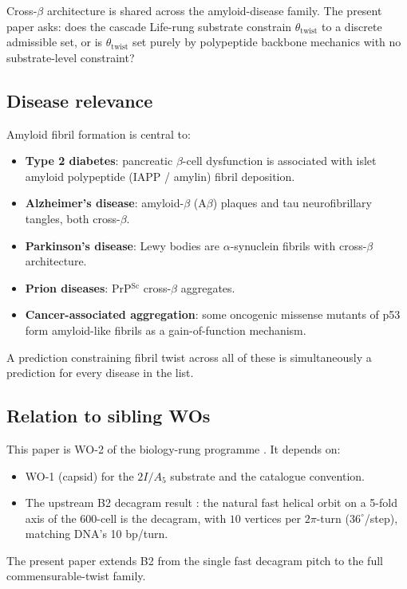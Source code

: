 \documentclass[12pt]{article}
\begin{document}
Cross-$\beta$ architecture is shared across the amyloid-disease
family. The present paper asks: does the cascade Life-rung
substrate constrain $\theta_{\mathrm{twist}}$ to a discrete
admissible set, or is $\theta_{\mathrm{twist}}$ set purely by
polypeptide backbone mechanics with no substrate-level
constraint?

\subsection{Disease relevance}

Amyloid fibril formation is central to:

\begin{itemize}
\item \textbf{Type 2 diabetes}: pancreatic $\beta$-cell
  dysfunction is associated with islet amyloid polypeptide
  (IAPP / amylin) fibril deposition.
\item \textbf{Alzheimer's disease}: amyloid-$\beta$ (A$\beta$)
  plaques and tau neurofibrillary tangles, both cross-$\beta$.
\item \textbf{Parkinson's disease}: Lewy bodies are
  $\alpha$-synuclein fibrils with cross-$\beta$ architecture.
\item \textbf{Prion diseases}: PrP$^{\mathrm{Sc}}$ cross-$\beta$
  aggregates.
\item \textbf{Cancer-associated aggregation}: some oncogenic
  missense mutants of p53 form amyloid-like fibrils as a
  gain-of-function mechanism.
\end{itemize}

A prediction constraining fibril twist across all of these is
simultaneously a prediction for every disease in the list.

\subsection{Relation to sibling WOs}

This paper is WO-2 of the biology-rung programme
\cite{SmartCapsid,SmartPhyllotaxis,SmartTubulin,SmartBioelectric}.
It depends on:
\begin{itemize}
\item WO-1 (capsid) for the $2I / A_5$ substrate and the
  catalogue convention.
\item The upstream B2 decagram result
  \cite[\S5.1]{CascadeBio}: the natural fast helical orbit on a
  5-fold axis of the 600-cell is the decagram, with $10$ vertices
  per $2\pi$-turn ($36^{\circ}$/step), matching DNA's 10 bp/turn.
\end{itemize}
The present paper extends B2 from the single fast decagram pitch
to the full commensurable-twist family.
\end{document}

